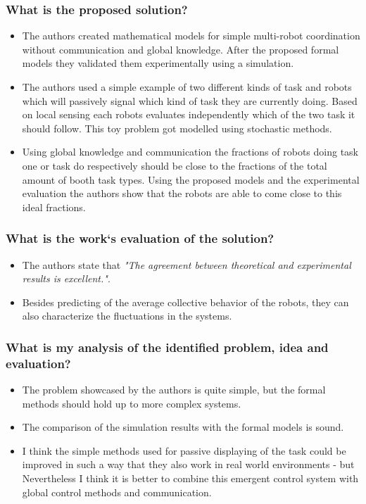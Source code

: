 \documentclass{article}
\begin{document}
\subsubsection*{What is the proposed solution?}
\begin{itemize}
    \item The authors created mathematical models for simple multi-robot coordination without communication and global knowledge. After the proposed formal models they validated them experimentally using a simulation.
    \item The authors used a simple example of two different kinds of task and robots which will passively signal which kind of task they are currently doing. Based on local sensing each robots evaluates independently which of the two task it should follow. This toy problem got modelled using  stochastic methods.
    \item Using global knowledge and communication the fractions of robots doing task one or task do respectively should be close to the fractions of the total amount of booth task types. Using the proposed models and the experimental evaluation the authors show that the robots are able to come close to this ideal fractions.
\end{itemize}
\subsubsection*{What is the work`s evaluation of the solution?}
\begin{itemize}
    \item The authors state that \emph{"The agreement between theoretical and experimental results is excellent."}. 
    \item Besides predicting of the average collective behavior of the robots, they can also characterize the fluctuations in the systems.
\end{itemize}
\subsubsection*{What is my analysis of the identified problem, idea and evaluation?}
\begin{itemize}
    \item The problem showcased by the authors is quite simple, but the formal methods should hold up to more complex systems.
    \item The comparison of the simulation results with the formal models is sound. 
    \item I think the simple methods used for passive displaying of the task could be improved in such a way that they also work in real world environments - but Nevertheless I think it is better to combine this emergent control system with  global control methods and communication.
\end{itemize}
\end{document}
